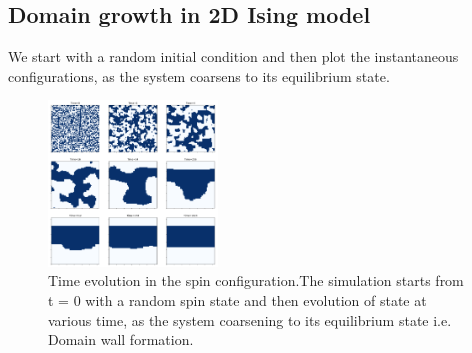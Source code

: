 \documentclass[5p,authoryear]{elsarticle}
\begin{document}
\subsection{Domain growth in 2D Ising model}
We start with a random initial condition and then plot the instantaneous configurations, as the system  coarsens to its equilibrium state.

\begin{figure}[h]
  \centering
  \includegraphics[width=0.4\textwidth]{Domain_growth.png}
  \caption{Time evolution in the spin configuration.The simulation starts from t = 0 with a random spin state and then evolution of state at various time, as the system coarsening to its equilibrium state i.e. Domain wall formation.}
\end{figure}
\end{document}
